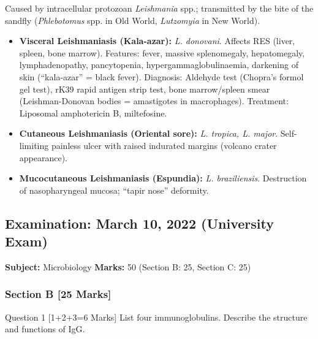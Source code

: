 \documentclass[11pt,a4paper]{article}
\begin{document}
\begin{ansbox}
Caused by intracellular protozoan \textit{Leishmania} spp.; transmitted by the bite of the sandfly (\textit{Phlebotomus} spp. in Old World, \textit{Lutzomyia} in New World).

\begin{itemize}[leftmargin=*]
    \item \textbf{Visceral Leishmaniasis (Kala-azar):} \textit{L. donovani}. Affects RES (liver, spleen, bone marrow). Features: fever, massive splenomegaly, hepatomegaly, lymphadenopathy, pancytopenia, hypergammaglobulinaemia, darkening of skin (``kala-azar'' = black fever). Diagnosis: Aldehyde test (Chopra's formol gel test), rK39 rapid antigen strip test, bone marrow/spleen smear (Leishman-Donovan bodies = amastigotes in macrophages). Treatment: Liposomal amphotericin B, miltefosine.
    \item \textbf{Cutaneous Leishmaniasis (Oriental sore):} \textit{L. tropica, L. major}. Self-limiting painless ulcer with raised indurated margins (volcano crater appearance).
    \item \textbf{Mucocutaneous Leishmaniasis (Espundia):} \textit{L. braziliensis}. Destruction of nasopharyngeal mucosa; ``tapir nose'' deformity.
\end{itemize}
\end{ansbox}

\subsection{Examination: March 10, 2022 (University Exam)}
\textbf{Subject:} Microbiology \quad \textbf{Marks:} 50 (Section B: 25, Section C: 25)

\subsubsection{Section B [25 Marks]}

\begin{qbox}{Question 1 [1+2+3=6 Marks]}
List four immunoglobulins. Describe the structure and functions of IgG.
\end{qbox}
\end{document}
